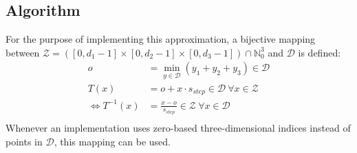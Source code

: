   \subsection{Algorithm}
  \label{domainalgorithm}
For the purpose of implementing this approximation, a bijective mapping between $\mathcal{Z}=([0,d_1-1] \times [0,d_2-1]\times [0,d_3-1]) \cap \mathbb{N}_0^3$ and $\mathcal{D}$ is defined:
\begin{align*}
o &= \min_{y \in \mathcal{D}}(y_1+y_2+y_3) \in \mathcal{D}\\
T(x) &= o+x\cdot s_{step} \in \mathcal{D} ~\forall x\in\mathcal{Z}\\
\Leftrightarrow T^{-1}(x) &= \frac{x-o}{s_{step}} \in \mathcal{Z} ~\forall x\in\mathcal{D}\\
\end{align*}
Whenever an implementation uses zero-based three-dimensional indices instead of points in $\mathcal{D}$, this mapping can be used.
